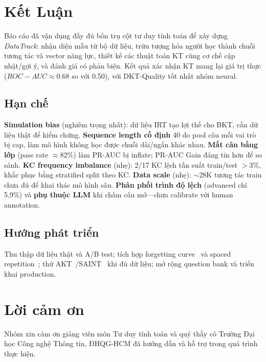 \documentclass[11pt]{article}
\newcommand{\sys}{\textit{DataTrack}}
\newcommand{\auc}{ROC-AUC}
\newcommand{\prauc}{PR-AUC}
\begin{document}
\section{Kết Luận}
Báo cáo đã vận dụng đầy đủ bốn trụ cột tư duy tính toán để xây dựng \sys{}: nhận diện mẫu từ bộ dữ liệu, trừu tượng hóa người học thành chuỗi tương tác và vector năng lực, thiết kế các thuật toán KT cùng cơ chế cập nhật/gợi ý, và đánh giá có phản biện. Kết quả xác nhận KT mang lại giá trị thực ($\auc\approx0.68$ so với 0.50), với DKT-Quality tốt nhất nhóm neural.

\subsection{Hạn chế}
\textbf{Simulation bias} (nghiêm trọng nhất): dữ liệu IRT tạo lợi thế cho BKT, cần dữ liệu thật để kiểm chứng. \textbf{Sequence length cố định} 40 do pool câu mỗi vai trò bị cap, làm mô hình không học được chuỗi dài/ngắn khác nhau. \textbf{Mất cân bằng lớp} (pass rate $\approx82\%$) làm \prauc{} bị inflate; \prauc{} Gain đáng tin hơn để so sánh. \textbf{KC frequency imbalance} (nhẹ): 2/17 KC lệch tần suất train/test $>3\%$, khắc phục bằng stratified split theo KC. \textbf{Data scale} (nhẹ): $\sim$28K tương tác train chưa đủ để khai thác mô hình sâu. \textbf{Phân phối trình độ lệch} (advanced chỉ 5,9\%) và \textbf{phụ thuộc LLM} khi chấm câu mở---chưa calibrate với human annotation.

\subsection{Hướng phát triển}
Thu thập dữ liệu thật và A/B test; tích hợp forgetting curve~\cite{ebbinghaus1885memory} và spaced repetition~\cite{wozniak1990optimization}; thử AKT~\cite{ghosh2020context}/SAINT~\cite{choi2020towards} khi đủ dữ liệu; mở rộng question bank và triển khai production.

\section*{Lời cảm ơn}
Nhóm xin cảm ơn giảng viên môn Tư duy tính toán và quý thầy cô Trường Đại học Công nghệ Thông tin, ĐHQG-HCM đã hướng dẫn và hỗ trợ trong quá trình thực hiện.
\end{document}
